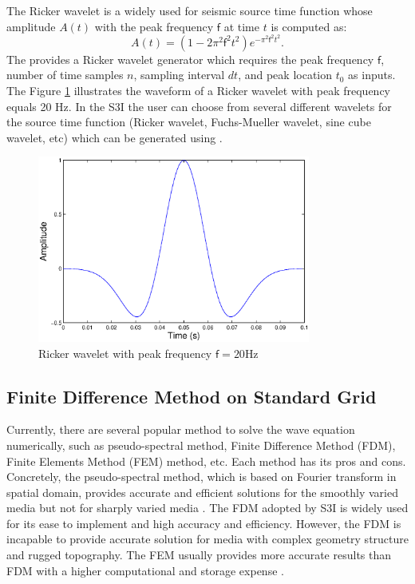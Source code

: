 \documentclass[11pt,titlepage]{article}
\newcommand{\sff}{\mathsf{f}}
\theoremstyle{plain}
\theoremstyle{definition}
\theoremstyle{remark}
\numberwithin{equation}{section}
\begin{document}
The Ricker wavelet is a widely used for seismic source time function whose amplitude $A(t)$ with the peak frequency $\sff$ at time $t$ is computed as:
\begin{equation}
A(t)=(1-2\pi^2 \sff^2 t^2)e^{-\pi^2 \sff^2 t^2}.
\end{equation}
The  provides a Ricker wavelet generator which requires the peak frequency $\sff$, number of time samples $n$, sampling interval $dt$, and peak location $t_0$ as inputs. The Figure \ref{fig:ricker} illustrates the waveform of a Ricker wavelet with peak frequency equals 20 Hz. In the S3I the user can choose from several different wavelets for the source time function (Ricker wavelet, Fuchs-Mueller wavelet, sine cube wavelet, etc) which can be generated using .

\begin{figure}[htbp]
\centering
\includegraphics[width=0.8\textwidth]{Fig/ricker}
\caption{Ricker wavelet with peak frequency $\sff=20$Hz}
\label{fig:ricker}
\end{figure}


\subsection{Finite Difference Method on Standard Grid}
Currently, there are several popular method to solve the wave equation numerically, such as pseudo-spectral method, Finite Difference Method (FDM), Finite Elements Method (FEM) method, etc. Each method has its pros and cons. Concretely, the pseudo-spectral method, which is based on Fourier transform in spatial domain, provides accurate and efficient solutions for the smoothly varied media but not for sharply varied media \cite{Kreiss:1972aa,Fornberg:1975aa,Fornberg:1987aa}. The FDM \cite{Alford:1974aa,Dablain:1986aa} adopted by S3I is widely used for its ease to implement and high accuracy and efficiency. However, the FDM is incapable to provide accurate solution for media with complex geometry structure and rugged topography. The FEM usually provides more accurate results than FDM with a higher computational and storage expense \cite{Kurt:1984aa}. 
\end{document}
